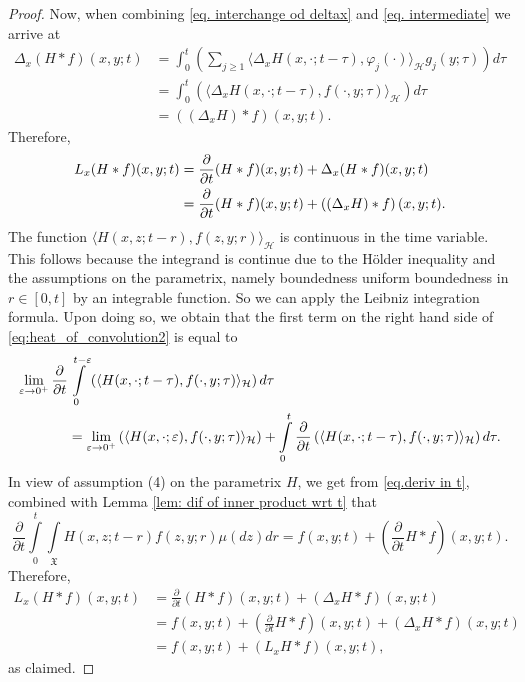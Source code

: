 \documentclass[11pt,reqno]{amsart}
\theoremstyle{remark}
\theoremstyle{definition}
\numberwithin{theorem}{section} \numberwithin{equation}{section}
\newcommand{\X}{\mathfrak{X}}
\begin{document}
\begin{proof}
Now, when combining \eqref{eq. interchange od deltax} and \eqref{eq. intermediate} we arrive at
\begin{align*}
\Delta_{x}(H\ast f)(x,y;t) &= \int_0^t \left( \sum_{j\geq 1} \langle \Delta_xH(x,\cdot;t-\tau),\varphi_j(\cdot) \rangle_\mathcal{H}  g_j(y;\tau)  \right)d\tau \\&=  \int_0^t \left( \langle \Delta_x H(x,\cdot;t-\tau),f(\cdot,y;\tau) \rangle_\mathcal{H}  \right)d\tau \\&=  \left( (\Delta_{x}H)\ast f\right)(x,y;t).
\end{align*}
Therefore,
\begin{align}\notag
L_{x}(H\ast f)(x,y;t)&=
    \frac{\partial}{\partial t}(H\ast f)(x,y;t)
    + \Delta_{x}(H\ast f)(x,y;t)\\ &=
  \frac{\partial}{\partial t}(H\ast f)(x,y;t)+  \left( (\Delta_{x}H)\ast f\right)(x,y;t).\label{eq:heat_of_convolution2}
\end{align}
The function $\langle H(x,z;t-r),f(z,y;r) \rangle_{\mathcal{H}}$ is continuous in the time variable.
This follows because the integrand is continue due to the H\"older inequality and the assumptions on the parametrix, namely boundedness
uniform boundedness in $r\in[0,t]$ by an integrable function.  So we can apply the
Leibniz integration formula.  Upon doing so, we obtain that
the first term on the right hand side of \eqref{eq:heat_of_convolution2} is equal to
\begin{align} \label{eq.deriv in t}
\lim_{\varepsilon\to 0^+}\frac{\partial}{\partial t}&\int\limits _{0}^{t-\varepsilon}\left( \langle H(x,\cdot;t-\tau),f(\cdot,y;\tau) \rangle_\mathcal{H}  \right)d\tau \\&
=\lim_{\varepsilon\to 0^+}\left( \langle H(x,\cdot;\varepsilon),f(\cdot,y;\tau) \rangle_\mathcal{H}  \right) +\int\limits _{0}^{t} \frac{\partial}{\partial t}\left( \langle H(x,\cdot;t-\tau),f(\cdot,y;\tau) \rangle_\mathcal{H}  \right)d\tau .\notag
\end{align}
In view of assumption (4) on the parametrix $H$, we get from \eqref{eq.deriv in t}, combined with Lemma \ref{lem: dif of inner product wrt t} that
$$
\frac{\partial}{\partial t}\int\limits _{0}^{t}\int\limits_{\X}H(x,z;t-r)f(z,y;r) \mu(dz)dr= f(x,y;t) + \left(\frac{\partial}{\partial t}H\ast f\right)(x,y;t).
$$
Therefore,
\begin{align*}
L_{x}(H\ast f)(x,y;t) &=
  \frac{\partial}{\partial t}(H\ast f)(x,y;t)+   (\Delta_{x}H\ast f)(x,y;t)
\\&=f(x,y;t)+\left(\frac{\partial}{\partial t}H\ast f\right)(x,y;t)+(\Delta_{x}H\ast f)(x,y;t)
\\&=f(x,y;t)+(L_{x}H\ast f)(x,y;t),
\end{align*}
as claimed.
\end{proof}
\end{document}

